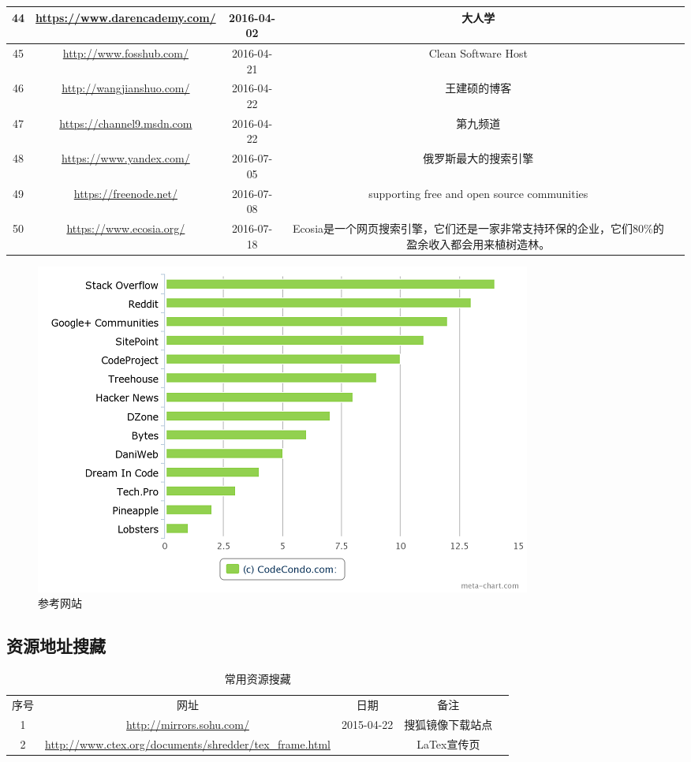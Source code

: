 \documentclass{book}
\begin{document}
\begin{longtable}{|c|c|c|c|c|}
	\hline
	44 & \url{https://www.darencademy.com/} & 2016-04-02 & 大人学\\
	\hline
	45 & \url{http://www.fosshub.com/} & 2016-04-21 & Clean Software Host\\
	\hline
	46 & \url{http://wangjianshuo.com/}	& 2016-04-22 & 王建硕的博客\\
	\hline
	47 & \url{https://channel9.msdn.com} & 2016-04-22 & 第九频道\\
	\hline
	48 & \url{https://www.yandex.com/} & 2016-07-05 & 俄罗斯最大的搜索引擎\\
	\hline
	49 & \url{https://freenode.net/} & 2016-07-08 & supporting free and open source communities\\
	50 & \url{https://www.ecosia.org/}	& 2016-07-18 & Ecosia是一个网页搜索引擎，它们还是一家非常支持环保的企业，它们80\%的盈余收入都会用来植树造林。 \\
	\hline
\end{longtable}


\begin{figure}[htbp]
	\centering
	\includegraphics[scale=0.8]{14-communities-programmers-go.png}
	\caption{参考网站}
	\label{DeobfuscationedDll}
\end{figure}

\subsection{资源地址搜藏}

\begin{longtable}{|c|c|c|c|c|}
	\caption{常用资源搜藏}\\
	\hline
	\multirow{1}{*}{序号}
	& \multicolumn{1}{c|}{网址}  
	& \multicolumn{1}{c|}{日期} 
	& \multicolumn{1}{c|}{备注}\\			
	\cline{1-4}
	1 & \url{http://mirrors.sohu.com/} & 2015-04-22 & 搜狐镜像下载站点\\
	\hline
	2 & \url{http://www.ctex.org/documents/shredder/tex_frame.html} & & LaTex宣传页\\
	\hline
\end{longtable}
\end{document}
